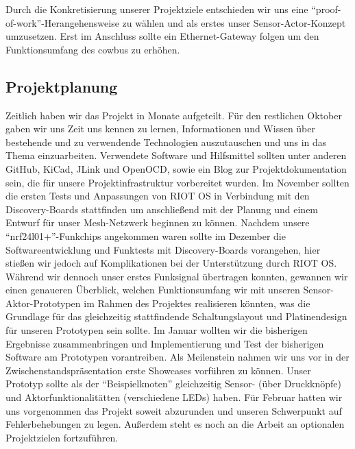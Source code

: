 \documentclass{IEEEtran}
\begin{document}
    Durch die Konkretisierung unserer Projektziele entschieden wir uns eine 
    \enquote{proof-of-work}-Herangehensweise zu wählen und als erstes unser 
    Sensor-Actor-Konzept umzusetzen. Erst im Anschluss sollte ein 
    Ethernet-Gateway folgen um den Funktionsumfang des cowbus zu erhöhen.

    \subsection{Projektplanung}
    Zeitlich haben wir das Projekt in Monate aufgeteilt. Für den restlichen Oktober 
    gaben wir uns Zeit uns kennen zu lernen, Informationen und Wissen über bestehende 
    und zu verwendende Technologien auszutauschen und uns in das Thema einzuarbeiten.
    Verwendete Software und Hilfsmittel sollten unter anderen GitHub, KiCad, JLink 
    und OpenOCD, sowie ein Blog zur Projektdokumentation sein, die für unsere 
    Projektinfrastruktur vorbereitet wurden.
    Im November sollten die ersten Tests und Anpassungen von RIOT OS in Verbindung 
    mit den Discovery-Boards stattfinden um anschließend mit der Planung und einem 
    Entwurf für unser Mesh-Netzwerk beginnen zu können.
    Nachdem unsere \enquote{nrf24l01+}-Funkchips angekommen waren sollte im Dezember 
    die Softwareentwicklung und  Funktests mit Discovery-Boards vorangehen, hier 
    stießen wir jedoch auf Komplikationen bei der Unterstützung durch RIOT OS. 
    Während wir dennoch unser erstes Funksignal übertragen konnten, gewannen wir 
    einen genaueren Überblick, welchen Funktionsumfang wir mit unseren 
    Sensor-Aktor-Prototypen im Rahmen des Projektes realisieren könnten, was die 
    Grundlage für das gleichzeitig stattfindende Schaltungslayout und 
    Platinendesign für unseren Prototypen sein sollte.
    Im Januar wollten wir die bisherigen Ergebnisse zusammenbringen und  
    Implementierung und Test der bisherigen Software am Prototypen vorantreiben. 
    Als Meilenstein nahmen wir uns vor in der Zwischenstandspräsentation erste 
    Showcases vorführen zu können. Unser Prototyp sollte als der 
    \enquote{Beispielknoten} gleichzeitig Sensor- (über Druckknöpfe) und 
    Aktorfunktionalitätten (verschiedene LEDs) haben.
    Für Februar hatten wir uns vorgenommen das Projekt soweit abzurunden und 
    unseren Schwerpunkt auf Fehlerbehebungen zu legen. Außerdem steht es noch an 
    die Arbeit an optionalen Projektzielen fortzuführen. 
\end{document}
